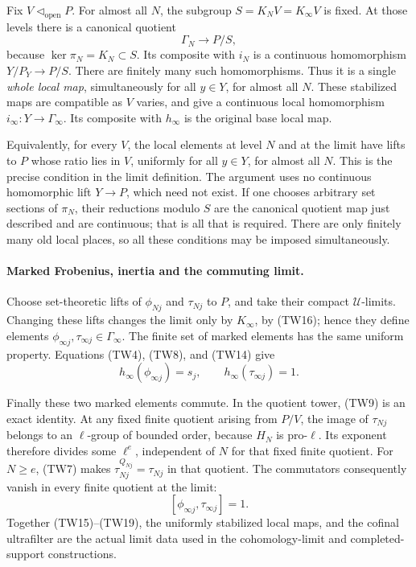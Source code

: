 Fix \(V\triangleleft_{\mathrm{open}}P\).
For almost all \(N\), the subgroup \(S=K_NV=K_\infty V\)
is fixed.  At those levels there is a canonical quotient
\[
                         \Gamma_N\longrightarrow P/S ,
\]
because \(\ker\pi_N=K_N\subset S\).
Its composite with \(i_N\) is a continuous homomorphism
\(Y/P_Y\to P/S\).
There are finitely many such homomorphisms.
Thus it is a single \emph{whole local map}, simultaneously for
all \(y\in Y\), for almost all \(N\).
These stabilized maps are compatible as \(V\) varies, and give
a continuous local homomorphism
\(i_\infty:Y\to\Gamma_\infty\).
Its composite with \(h_\infty\) is the original base local map.

Equivalently, for every \(V\), the local elements at level \(N\)
and at the limit have lifts to \(P\) whose ratio lies in \(V\),
uniformly for all \(y\in Y\), for almost all \(N\).
This is the precise  condition in the limit
definition.
The argument uses no continuous homomorphic lift
\(Y\to P\), which need not exist.
If one chooses arbitrary set sections of \(\pi_N\), their
reductions modulo \(S\) are the canonical quotient map just
described and are continuous; that is all that is required.
There are only finitely many old local places, so all these
conditions may be imposed simultaneously.

\paragraph{Marked Frobenius, inertia and the commuting limit.}
Choose set-theoretic lifts of \(\phi_{Nj}\) and \(\tau_{Nj}\)
to \(P\), and take their compact \(\mathcal U\)-limits.
Changing these lifts changes the limit only by \(K_\infty\),
by (TW16); hence they define elements
\(\phi_{\infty j},\tau_{\infty j}\in\Gamma_\infty\).
The finite set of marked elements has the same uniform
 property.
Equations (TW4), (TW8), and (TW14) give
\[
 h_\infty(\phi_{\infty j})=s_j,\qquad
 h_\infty(\tau_{\infty j})=1 .
 \tag{TW18}
\]

Finally these two marked elements commute.
In the quotient tower, (TW9) is an exact identity.
At any fixed finite quotient arising from \(P/V\), the image of
\(\tau_{Nj}\) belongs to an \(\ell\)-group of bounded order,
because \(H_N\) is pro-\(\ell\).
Its exponent therefore divides some \(\ell^e\), independent of
\(N\) for that fixed finite quotient.
For \(N\geq e\), (TW7) makes
\(\tau_{Nj}^{Q_{Nj}}=\tau_{Nj}\) in that quotient.
The commutators consequently vanish in every finite quotient
at the limit:
\[
                        [\phi_{\infty j},\tau_{\infty j}]=1 .
 \tag{TW19}
\]
Together (TW15)--(TW19), the uniformly stabilized local maps,
and the cofinal ultrafilter are the actual limit data used in
the cohomology-limit and completed-support constructions.

